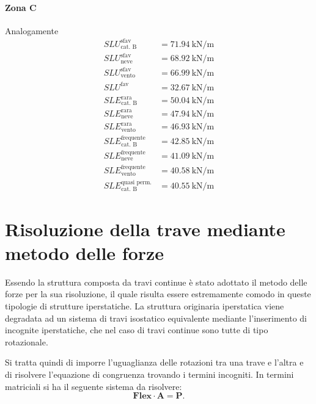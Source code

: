 \paragraph*{Zona C} Analogamente
\begin{align*} 
	SLU^{\text{sfav}}_{\text{cat. B}}		&= \SI{71.94}{\kilo\newton\per\meter} \\
	SLU^{\text{sfav}}_{\text{neve}} 		&= \SI{68.92}{\kilo\newton\per\meter} \\
	SLU^{\text{sfav}}_{\text{vento}} 		&= \SI{66.99}{\kilo\newton\per\meter} \\
	SLU^{\text{fav}} 						&= \SI{32.67}{\kilo\newton\per\meter} \\	
	SLE^{\text{rara}}_{\text{cat. B}} 		&= \SI{50.04}{\kilo\newton\per\meter} \\
	SLE^{\text{rara}}_{\text{neve}}			&= \SI{47.94}{\kilo\newton\per\meter} \\
	SLE^{\text{rara}}_{\text{vento}} 		&= \SI{46.93}{\kilo\newton\per\meter} \\
	SLE^{\text{frequente}}_{\text{cat. B}} 	&= \SI{42.85}{\kilo\newton\per\meter} \\
	SLE^{\text{frequente}}_{\text{neve}} 	&= \SI{41.09}{\kilo\newton\per\meter} \\
	SLE^{\text{frequente}}_{\text{vento}} 	&= \SI{40.58}{\kilo\newton\per\meter} \\
	SLE^{\text{quasi perm.}}_{\text{cat. B}}&= \SI{40.55}{\kilo\newton\per\meter}
\end{align*}

\section{Risoluzione della trave mediante metodo delle forze}
Essendo la struttura composta da travi continue è stato adottato il metodo delle forze per la sua risoluzione, il quale risulta essere estremamente comodo in queste tipologie di strutture iperstatiche.
La struttura originaria iperstatica viene degradata ad un sistema di travi isostatico equivalente mediante l'inserimento di incognite iperstatiche, che nel caso di travi continue sono tutte di tipo rotazionale.

Si tratta quindi di imporre l'uguaglianza delle rotazioni tra una trave e l'altra e di risolvere l'equazione di congruenza trovando i termini incogniti.
In termini matriciali si ha il seguente sistema da risolvere:
\begin{equation}
\mathbf{Flex}\cdot\mathbf{A} =  \mathbf{P}.
\end{equation}

